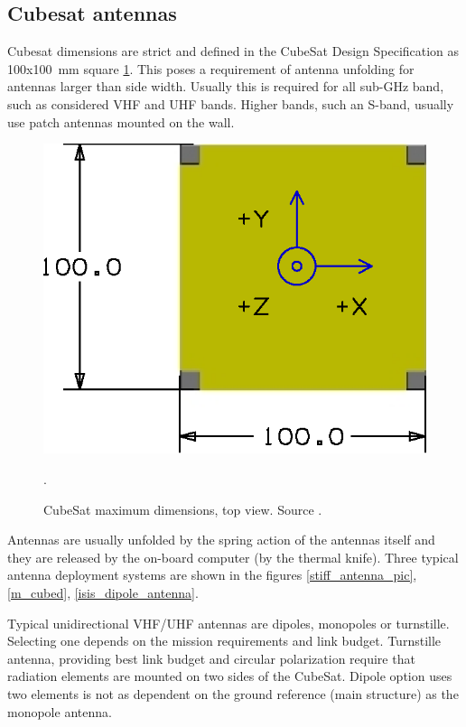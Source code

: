 \subsection{Cubesat antennas}
Cubesat dimensions are strict and defined in the CubeSat Design Specification \cite{cubesat_spec} as \si{100}x\si{100}~mm square \ref{CubeSat_max_dim}. This poses a requirement of antenna unfolding for antennas larger than side width. Usually this is required for all sub-GHz band, such as considered VHF and UHF bands. Higher bands, such an S-band, usually use patch antennas mounted on the wall.

\begin{figure}
    \centering
    \includegraphics[width=0.5\paperwidth]{img/2/cubesat_dimensions.eps}
    \caption{CubeSat maximum dimensions, top view. Source \cite{cubesat_spec}.}.
    \label{CubeSat_max_dim}
\end{figure}

Antennas are usually unfolded by the spring action of the antennas itself and they are released by the on-board computer (by the thermal knife). Three typical antenna deployment systems are shown in the figures \ref{stiff_antenna_pic}, \ref{m_cubed}, \ref{isis_dipole_antenna}.

Typical unidirectional VHF/UHF antennas are dipoles, monopoles or turnstille. Selecting one depends on the mission requirements and link budget. Turnstille antenna, providing best link budget and circular polarization require that radiation elements are mounted on two sides of the CubeSat. Dipole option uses two elements is not as dependent on the ground reference (main structure) as the monopole antenna.

